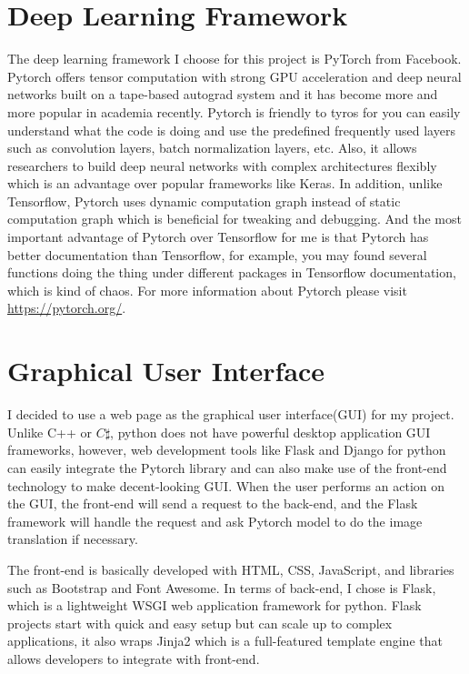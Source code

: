 \section{Deep Learning Framework}
The deep learning framework I choose for this project is PyTorch from Facebook. 
Pytorch offers tensor computation with strong GPU acceleration and deep neural 
networks built on a tape-based autograd system and it has become 
more and more popular in academia recently. Pytorch is friendly to tyros for 
you can easily understand what the code is doing and use the predefined 
frequently used layers such as convolution layers, batch normalization layers, 
etc. Also, it allows researchers to build deep neural networks with complex 
architectures flexibly which is an advantage over popular frameworks like Keras.
In addition, unlike Tensorflow, Pytorch uses dynamic computation graph instead 
of static computation graph which is beneficial for tweaking and debugging. And 
the most important advantage of Pytorch over Tensorflow for me is that Pytorch 
has better documentation than Tensorflow, for example, you may found several 
functions doing the thing under different packages in Tensorflow documentation,
which is kind of chaos. For more information about Pytorch please visit 
\href{https://pytorch.org/}{https://pytorch.org/}.

\section{Graphical User Interface}
I decided to use a web page as the graphical user interface(GUI) for my project.
Unlike C++ or $C\sharp$, python does not have powerful desktop application GUI 
frameworks, however, 
web development tools like Flask and Django for python can easily integrate the Pytorch 
library and can also make use of the front-end technology to make decent-looking 
GUI. When the user performs an action on the GUI, the front-end will send a request to 
the back-end, and the Flask framework will handle the request and ask Pytorch model to 
do the image translation if necessary. 

The front-end is basically developed with HTML, 
CSS, JavaScript, and libraries such as Bootstrap and Font Awesome.
In terms of back-end, I chose is Flask, which is a lightweight WSGI web application 
framework for python. Flask projects start with quick and easy setup but can scale 
up to complex applications, it also wraps Jinja2 which is a full-featured template 
engine that allows developers to integrate with front-end. 

